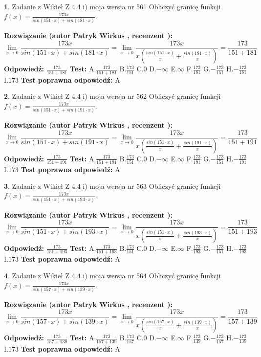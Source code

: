 \documentclass[12pt, a4paper]{article}
\theoremstyle{definition} %
\newtheorem{zad}{}
\newcommand{\zadStart}[1]{\begin{zad}#1\newline}
\newcommand{\zadStop}{\end{zad}}
\newcommand{\rozwStart}[2]{\noindent \textbf{Rozwiązanie (autor #1 , recenzent #2): }\newline}
\newcommand{\rozwStop}{\newline}
\newcommand{\odpStart}{\noindent \textbf{Odpowiedź:}\newline}
\newcommand{\odpStop}{\newline}
\newcommand{\testStart}{\noindent \textbf{Test:}\newline}
\newcommand{\testStop}{\newline}
\newcommand{\kluczStart}{\noindent \textbf{Test poprawna odpowiedź:}\newline}
\newcommand{\kluczStop}{\newline}
\begin{document}
\zadStart{Zadanie z Wikieł Z 4.4 i) moja wersja nr 561}
Obliczyć granicę funkcji $f(x)=\frac{173x}{sin(151\cdot x) +sin(181\cdot x)}$.
\zadStop
\rozwStart{Patryk Wirkus}{}
$$\lim\limits_{x\to 0}\frac{173x}{sin(151\cdot x) +sin(181\cdot x)}=\lim\limits_{x\to 0}\frac{173x}{x(\frac{sin(151\cdot x)}{x}+\frac{sin(181\cdot x)}{x})}=\frac{173}{151+181}$$
\rozwStop
\odpStart
$\frac{173}{151+181}$
\odpStop
\testStart
A.$\frac{173}{151+181}$
B.$\frac{173}{151}$
C.$0$
D.$-\infty$
E.$\infty$
F.$\frac{173}{181}$
G.$-\frac{173}{151}$
H.$-\frac{173}{181}$
I.$173$
\testStop
\kluczStart
A
\kluczStop



\zadStart{Zadanie z Wikieł Z 4.4 i) moja wersja nr 562}
Obliczyć granicę funkcji $f(x)=\frac{173x}{sin(151\cdot x) +sin(191\cdot x)}$.
\zadStop
\rozwStart{Patryk Wirkus}{}
$$\lim\limits_{x\to 0}\frac{173x}{sin(151\cdot x) +sin(191\cdot x)}=\lim\limits_{x\to 0}\frac{173x}{x(\frac{sin(151\cdot x)}{x}+\frac{sin(191\cdot x)}{x})}=\frac{173}{151+191}$$
\rozwStop
\odpStart
$\frac{173}{151+191}$
\odpStop
\testStart
A.$\frac{173}{151+191}$
B.$\frac{173}{151}$
C.$0$
D.$-\infty$
E.$\infty$
F.$\frac{173}{191}$
G.$-\frac{173}{151}$
H.$-\frac{173}{191}$
I.$173$
\testStop
\kluczStart
A
\kluczStop



\zadStart{Zadanie z Wikieł Z 4.4 i) moja wersja nr 563}
Obliczyć granicę funkcji $f(x)=\frac{173x}{sin(151\cdot x) +sin(193\cdot x)}$.
\zadStop
\rozwStart{Patryk Wirkus}{}
$$\lim\limits_{x\to 0}\frac{173x}{sin(151\cdot x) +sin(193\cdot x)}=\lim\limits_{x\to 0}\frac{173x}{x(\frac{sin(151\cdot x)}{x}+\frac{sin(193\cdot x)}{x})}=\frac{173}{151+193}$$
\rozwStop
\odpStart
$\frac{173}{151+193}$
\odpStop
\testStart
A.$\frac{173}{151+193}$
B.$\frac{173}{151}$
C.$0$
D.$-\infty$
E.$\infty$
F.$\frac{173}{193}$
G.$-\frac{173}{151}$
H.$-\frac{173}{193}$
I.$173$
\testStop
\kluczStart
A
\kluczStop



\zadStart{Zadanie z Wikieł Z 4.4 i) moja wersja nr 564}
Obliczyć granicę funkcji $f(x)=\frac{173x}{sin(157\cdot x) +sin(139\cdot x)}$.
\zadStop
\rozwStart{Patryk Wirkus}{}
$$\lim\limits_{x\to 0}\frac{173x}{sin(157\cdot x) +sin(139\cdot x)}=\lim\limits_{x\to 0}\frac{173x}{x(\frac{sin(157\cdot x)}{x}+\frac{sin(139\cdot x)}{x})}=\frac{173}{157+139}$$
\rozwStop
\odpStart
$\frac{173}{157+139}$
\odpStop
\testStart
A.$\frac{173}{157+139}$
B.$\frac{173}{157}$
C.$0$
D.$-\infty$
E.$\infty$
F.$\frac{173}{139}$
G.$-\frac{173}{157}$
H.$-\frac{173}{139}$
I.$173$
\testStop
\kluczStart
A
\kluczStop
\end{document}
